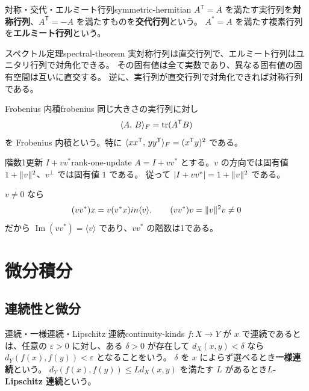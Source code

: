 \begin{definition}{対称・交代・エルミート行列}{symmetric-hermitian}
$A^{\mathsf T}=A$ を満たす実行列を\textbf{対称行列}、$A^{\mathsf T}=-A$ を満たすものを\textbf{交代行列}という。
$A^*=A$ を満たす複素行列を\textbf{エルミート行列}という。
\end{definition}

\begin{theorem}{スペクトル定理}{spectral-theorem}
実対称行列は直交行列で、エルミート行列はユニタリ行列で対角化できる。
その固有値は全て実数であり、異なる固有値の固有空間は互いに直交する。
逆に、実行列が直交行列で対角化できれば対称行列である。
\end{theorem}

\begin{definition}{Frobenius 内積}{frobenius}
同じ大きさの実行列に対し
\[
  \langle A,\, B \rangle_{F}=\operatorname{tr}(A^{\mathsf T}B)
\]
を Frobenius 内積という。特に
$\langle xx^{\mathsf T},\, yy^{\mathsf T} \rangle_F=(x^{\mathsf T}y)^2$ である。
\end{definition}

\begin{proposition}{階数1更新 $I+vv^*$}{rank-one-update}
$A=I+vv^*$ とする。$v$ の方向では固有値 $1+\lVert v \rVert^2$、$v^\perp$ では固有値 $1$ である。
従って $|I+vv^*|=1+\lVert v \rVert^2$ である。

$v\ne0$ なら
\[
(vv^*)x=v(v^*x)in\langle v\rangle,
\qquad
(vv^*)v=\lVert v \rVert^2v\ne0
\]
だから $\operatorname{Im}(vv^*)=\langle v\rangle$ であり、$vv^*$ の階数は1である。
\end{proposition}

\chapter{微分積分}
\label{ch:calculus}

\section{連続性と微分}

\begin{definition}{連続・一様連続・Lipschitz 連続}{continuity-kinds}
$f:X\to Y$ が $x$ で連続であるとは、任意の $\varepsilon>0$ に対し、ある $\delta>0$ が存在して
$d_X(x,y)<\delta$ なら $d_Y(f(x),f(y))<\varepsilon$ となることをいう。
$\delta$ を $x$ によらず選べるとき\textbf{一様連続}という。
$d_Y(f(x),f(y))\le Ld_X(x,y)$ を満たす $L$ があるとき\textbf{$L$-Lipschitz 連続}という。
\end{definition}

